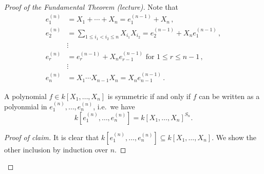 \begin{proof}[Proof of the Fundamental Theorem (lecture)]
  Note that
  \begin{align*}
        e^{(n)}_1
    &=  X_1 + \dotsb + X_n = e_1^{(n-1)} + X_n \,,  \\
        e^{(n)}_2
    &=  \sum_{1 \leq i_1 < i_2 \leq n} X_{i_1} X_{i_2} = e_2^{(n-1)} + X_n e_1^{(n-1)} \,,  \\
    &   \vdots \tag{$\ast$}\\ 
        e^{(n)}_r
    &=  e^{(n-1)}_r + X_n e^{(n-1)}_{r-1} \text{ for } 1 \leq r \leq n-1 \,,  \\
    &   \vdots \\
        e^{(n)}_n
    &=  X_1 \dotsm X_{n-1} X_n = X_n e^{(n-1)}_{n-1} \,.
  \end{align*}
  \begin{claim}
    A polynomial $f \in k[X_1, \dotsc, X_n]$ is symmetric if and only if $f$ can be written as a polyonmial in $e^{(n)}_1, \dotsc, e^{(n)}_n$, i.e.\ we have
    \[
        k\left[ e^{(n)}_1, \dotsc, e^{(n)}_n \right]
      = k[X_1, \dotsc, X_n]^{S_n}.
    \]
  \end{claim}
  \begin{proof}[Proof of claim]
    It is clear that $k\left[ e^{(n)}_1, \dotsc, e^{(n)}_n \right] \subseteq k[X_1, \dotsc, X_n]$.
    We show the other inclusion by induction over $n$.
    

\end{proof}
\end{proof}
